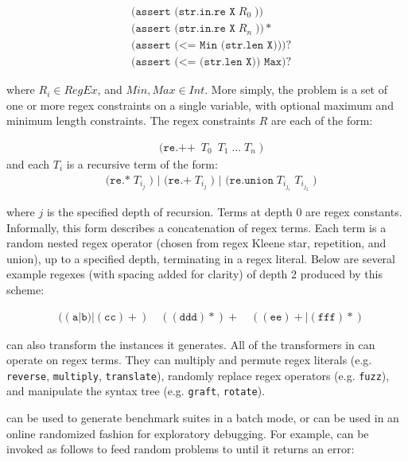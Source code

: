 {\begingroup
\footnotesize
\begin{align*}
  & \texttt{(assert (str.in.re X}\; R_0\; \texttt{))} \\
  & \texttt{(assert (str.in.re X}\; R_n\; \texttt{))}* \\
  & \texttt{(assert (<= Min (str.len X)))}? \\
  & \texttt{(assert (<= (str.len X)) Max)}?
\end{align*}
\endgroup

where $R_i \in RegEx$, and $Min, Max \in Int$. More simply, the
problem is a set of one or more regex constraints on a single
variable, with optional maximum and minimum length constraints. The
regex constraints $R$ are each of the form:

\begingroup
\footnotesize
\begin{align*}
  & \texttt{(re.++}\; \ T_0\; \ T_1\; \texttt{...}\; T_n\; \texttt{)}
\end{align*}
\endgroup
and each $T_i$ is a recursive term of the form:
\begingroup
\footnotesize
\begin{align*}
  & \texttt{(re.*}\; T_{i_j}\; \texttt{) | (re.+}\; T_{i_j}\;
  \texttt{) | (re.union}\; T_{i_{j_1}}\; T_{i_{j_2}}\; \texttt{)}
\end{align*}
\endgroup

where $j$ is the specified depth of recursion. Terms at depth 0 are
regex constants. Informally, this form describes a concatenation of
regex terms. Each term is a random nested regex operator (chosen from
regex Kleene star, repetition, and union), up to a specified depth,
terminating in a regex literal. Below are several example regexes
(with spacing added for clarity) of depth 2 produced by this scheme:

\begingroup
\footnotesize
\begin{align*}
  & ((\texttt{a}|\texttt{b})|(\texttt{cc})+)\quad
  ((\texttt{ddd})*)+\quad ((\texttt{ee})+|(\texttt{fff})*)
\end{align*}
\endgroup

\fuzzer{} can also transform the instances it generates. All of the
transformers in \transformer{} can operate on regex terms. They can
multiply and permute regex literals (e.g. \texttt{reverse},
\texttt{multiply}, \texttt{translate}), randomly replace regex
operators (e.g. \texttt{fuzz}), and manipulate the syntax tree
(e.g. \texttt{graft}, \texttt{rotate}).
        
 \fuzzer{} can be used to
generate benchmark suites in a batch mode, or can be used in an online
randomized fashion for exploratory debugging. For example, \fuzzer{}
can be invoked as follows to feed random problems to \cvc{} until it
returns an error:

}
